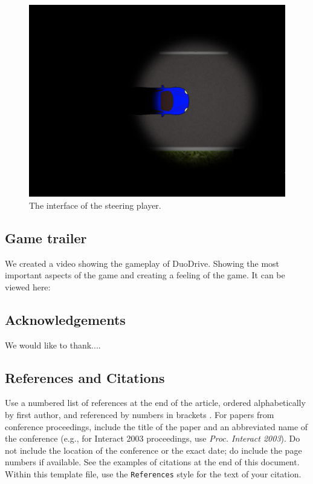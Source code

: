 \documentclass{sigchi}
\begin{document}
\begin{figure}[!h]
\centering
\includegraphics[width=0.9\columnwidth]{Figure1}
\caption{The interface of the steering player.}
\label{fig:figure1}
\end{figure}

\subsection{Game trailer}

We created a video showing the gameplay of DuoDrive.
Showing the most important aspects of the game and creating
a feeling of the game. It can be viewed here:

\subsection{Acknowledgements}

We would like to thank....

\subsection{References and Citations}

Use a numbered list of references at the end of the article, ordered
alphabetically by first author, and referenced by numbers in brackets
\cite{ethics,
  Klemmer:2002:WSC:503376.503378,
  Mather:2000:MUT,
  Zellweger:2001:FAO:504216.504224}. For
papers from conference proceedings, include the title of the paper and
an abbreviated name of the conference (e.g., for Interact 2003
proceedings, use \textit{Proc. Interact 2003}). Do not include the
location of the conference or the exact date; do include the page
numbers if available. See the examples of citations at the end of this
document. Within this template file, use the \texttt{References} style
for the text of your citation.
\end{document}
